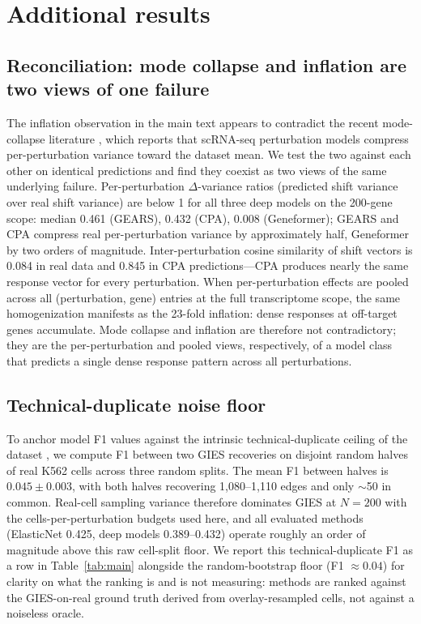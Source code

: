 \documentclass{article}
\theoremstyle{plain}
\theoremstyle{definition}
\theoremstyle{remark}
\begin{document}
\section{Additional results}

\subsection{Reconciliation: mode collapse and inflation are two views of one failure}
\label{sec:reconciliation}
The inflation observation in the main text appears to contradict the recent mode-collapse literature \citep{mejia2025diversity,ahlmanneltze2025}, which reports that scRNA-seq perturbation models compress per-perturbation variance toward the dataset mean. We test the two against each other on identical predictions and find they coexist as two views of the same underlying failure. Per-perturbation $\Delta$-variance ratios (predicted shift variance over real shift variance) are below 1 for all three deep models on the 200-gene scope: median 0.461 (GEARS), 0.432 (CPA), 0.008 (Geneformer); GEARS and CPA compress real per-perturbation variance by approximately half, Geneformer by two orders of magnitude. Inter-perturbation cosine similarity of shift vectors is 0.084 in real data and 0.845 in CPA predictions---CPA produces nearly the same response vector for every perturbation. When per-perturbation effects are pooled across all (perturbation, gene) entries at the full transcriptome scope, the same homogenization manifests as the 23-fold inflation: dense responses at off-target genes accumulate. Mode collapse and inflation are therefore not contradictory; they are the per-perturbation and pooled views, respectively, of a model class that predicts a single dense response pattern across all perturbations.

\subsection{Technical-duplicate noise floor}
\label{sec:noisefloor}
To anchor model F1 values against the intrinsic technical-duplicate ceiling of the dataset \citep{mejia2025diversity,miller2025calibrated}, we compute F1 between two GIES recoveries on disjoint random halves of real K562 cells across three random splits. The mean F1 between halves is $0.045 \pm 0.003$, with both halves recovering 1{,}080--1{,}110 edges and only $\sim$50 in common. Real-cell sampling variance therefore dominates GIES at $N{=}200$ with the cells-per-perturbation budgets used here, and all evaluated methods (ElasticNet 0.425, deep models 0.389--0.432) operate roughly an order of magnitude above this raw cell-split floor. We report this technical-duplicate F1 as a row in Table~\ref{tab:main} alongside the random-bootstrap floor (F1 $\approx 0.04$) for clarity on what the ranking is and is not measuring: methods are ranked against the GIES-on-real ground truth derived from overlay-resampled cells, not against a noiseless oracle.
\end{document}
